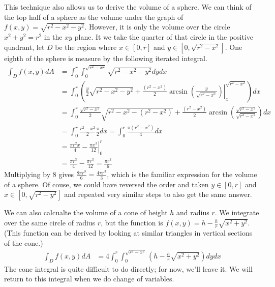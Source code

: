 \documentclass[fleqn,letterpaper]{report}
\begin{document}
\begin{example}
This technique also allows us to derive the volume of a
sphere. We can think of the top half of a sphere as the
volume under the graph of $f(x,y) = \sqrt{r^2 - x^2 - y^2}$.
However, it is only the volume over the circle $x^2 + y^2 =
r^2$ in the $xy$ plane. It we take the quarter of that circle
in the positive quadrant, let $D$ be the region where 
$x \in [0,r]$ and $y \in [0, \sqrt{r^2-x^2}]$. One
eighth of the sphere is measure by the following iterated
integral.
\begin{align*}
\int_D f(x,y) dA & = \int_0^r \int_0^{\sqrt{r^2-x^2}} \sqrt{r^2
- x^2 - y^2} dy dx \\
& = \int_0^r \left( \frac{y}{2} \sqrt{r^2 - x^2 - y^2} +
\left. \frac{(r^2 - x^2)}{2} \arcsin \left( \frac{y}{\sqrt{r^2 -
x^2}} \right) \right|_x^{\sqrt{r^2 - x^2}} \right) dx \\
& = \int_0^r \frac{\sqrt{r^2 - x^2}}{2} \sqrt{ r^2 - x^2 - (r^2 -
x^2)} + \frac{(r^2-x^2)}{2} \arcsin \left( \frac{ \sqrt{r^2 -
x^2}}{\sqrt{r^2 - x^2}} \right) dx \\
& = \int_0^r \frac{r^2 - x^2}{2} \frac{\pi}{2} dx = \int_0^r
\frac{\pi (r^2-x^2)}{4} dx \\
& = \left. \frac{\pi r^2x}{4} - \frac{\pi x^3}{12} \right|_0^r
\\
& = \frac{\pi r^3}{4} - \frac{\pi r^3}{12} = \frac{\pi
r^3}{6}
\end{align*}
Multiplying by $8$ gives $\frac{8\pi r^3}{6} = \frac{4\pi
r^3}{3}$, which is the familiar expression for the volume of a
sphere. Of couse, we could have reversed the order and taken
$y \in [0,r]$ and $x \in [0, \sqrt{r^2 - y^2}]$ and repeated
very similar steps to also get the same answer.
\end{example}

\begin{example}
We can also calcualte the volume of a cone of height $h$ and
radius $r$. We integrate over the same circle of radius $r$,
but the function is $f(x,y) = h - \frac{h}{r} \sqrt{x^2 +
y^2}$. (This function can be derived by looking at similar
triangles in vertical sections of the cone.)
\begin{align*}
\int_D f(x,y) dA & = 4 \int_0^r \int_0^{\sqrt{r^2 - x^2}} \left(
h - \frac{h}{r} \sqrt{x^2 + y^2} \right) dy dx
\end{align*}
The cone integral is quite difficult to do directly; for now,
we'll leave it. We will return to this integral when we do
change of variables.
\end{example}
\end{document}
